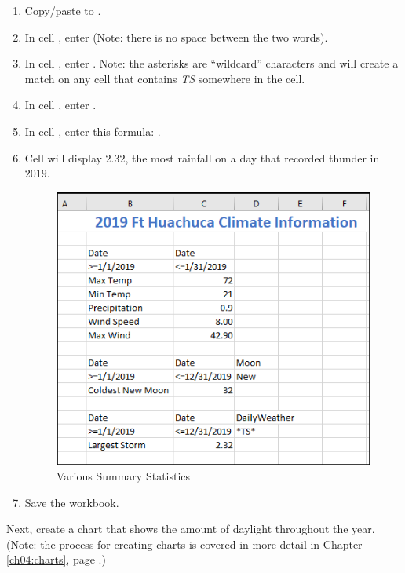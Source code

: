 \begin{enumbox}
\begin{enumerate}
		\item Copy/paste  to .
		\item In cell , enter  (Note: there is no space between the two words).
		\item In cell , enter . Note: the asterisks are ``wildcard'' characters and will create a match on any cell that contains \textit{TS} somewhere in the cell.
		\item In cell , enter .
		\item In cell , enter this formula: .
		\item Cell  will display $ 2.32 $, the most rainfall on a day that recorded thunder in $ 2019 $.
		
		\begin{figure}[H]
			\centering
			\includegraphics[width=\maxwidth{.95\linewidth}]{gfx/ch09_fig87}
			\caption{Various Summary Statistics}
			\label{09:fig87}
		\end{figure}
		\item Save the  workbook.
		
	\end{enumerate}	
\end{enumbox}

Next, create a chart that shows the amount of daylight throughout the year. (Note: the process for creating charts is covered in more detail in Chapter \ref{ch04:charts}, page \pageref{ch04:charts}.)

